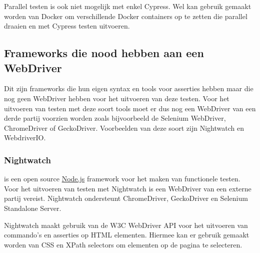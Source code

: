 Parallel testen is ook niet mogelijk met enkel Cypress. Wel kan gebruik gemaakt worden van Docker om verschillende Docker containers op te zetten die parallel draaien en met Cypress testen uitvoeren.

\subsection{Frameworks die nood hebben aan een WebDriver}

Dit zijn \glspl{framework} die hun eigen syntax en \glspl{tool} voor \glspl{assertie} hebben maar die nog geen \gls{WebDriver} hebben voor het uitvoeren van deze testen. Voor het uitvoeren van testen met deze soort \glspl{tool} moet er dus nog een \gls{WebDriver} van een derde partij voorzien worden zoals bijvoorbeeld de Selenium \gls{WebDriver}, ChromeDriver of GeckoDriver. Voorbeelden van deze soort zijn Nightwatch en WebdriverIO.

\subsubsection{Nightwatch}

\textcite{Nightwatch} is een open source \hyperref[nodejs]{Node.js} \gls{framework} voor het maken van functionele testen. Voor het uitvoeren van testen met Nightwatch is een \gls{WebDriver} van een externe partij vereist. Nightwatch ondersteunt ChromeDriver, GeckoDriver en Selenium Standalone Server.



Nightwatch maakt gebruik van de W3C \gls{WebDriver} \gls{API} voor het uitvoeren van commando's en \glspl{assertie} op \gls{HTML} elementen. Hiermee kan er gebruik gemaakt worden van \gls{CSS} en \gls{XPath} selectors om elementen op de pagina te selecteren.

